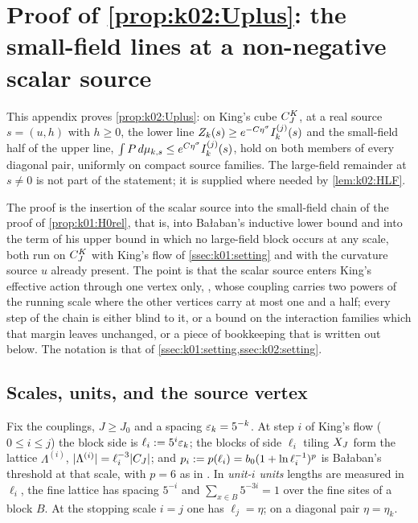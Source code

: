 \section{Proof of \cref{prop:k02:Uplus}: the small-field lines at a non-negative scalar source}\label{app:a03_Uplus}

This appendix proves \cref{prop:k02:Uplus}: on King's cube $C^{K}_{J}$, at a real source $s=(u,h)$ with $h\ge0$, the lower line $Z_{k}(s)\ge e^{-C\eta^\sigma}I^{(j)}_{k}(s)$ and the small-field half of the upper line, $\int P\,d\mu_{k,s}\le e^{C\eta^\sigma}I^{(j)}_{k}(s)$, hold on both members of every diagonal pair, uniformly on compact source families. The large-field remainder at $s\ne0$ is not part of the statement; it is supplied where needed by \cref{lem:k02:HLF}.

The proof is the insertion of the scalar source into the small-field chain of the proof of \cref{prop:k01:H0rel}, that is, into Ba{\l}aban's inductive lower bound \cite[Sect.~3]{Ba1} and into the term of his upper bound \cite[(2.43)]{Ba2} in which no large-field block occurs at any scale, both run on $C^{K}_{J}$ with King's flow of \cref{ssec:k01:setting} and with the curvature source $u$ already present. The point is that the scalar source enters King's effective action through one vertex only, \cite[(3.21)]{K1}, whose coupling carries two powers of the running scale where the other vertices carry at most one and a half; every step of the chain is either blind to it, or a bound on the interaction families which that margin leaves unchanged, or a piece of bookkeeping that is written out below. The notation is that of \cref{ssec:k01:setting,ssec:k02:setting}.

\subsection{Scales, units, and the source vertex}\label{ssec:a03:setting}

Fix the couplings, $J\ge J_0$ and a spacing $\varepsilon_k=5^{-k}$. At step $i$ of King's flow ($0\le i\le j$) the block side is $\ell_i:=5^{i}\varepsilon_k$; the blocks of side $\ell_i$ tiling $X_J$ form the lattice $\Lambda^{(i)}$, $|\Lambda^{(i)}|=\ell_i^{-3}|C_J|$; and $p_i:= p(\ell_i)=b_0(1+\ln\ell_i^{-1})^{p}$ is Ba{\l}aban's threshold at that scale, with $p=6$ as in \cite[(3.54)]{Ba1}. In \emph{unit-$i$ units} lengths are measured in $\ell_i$, the fine lattice has spacing $5^{-i}$ and $\sum_{x\in B}5^{-3i}=1$ over the fine sites of a block $B$. At the stopping scale $i=j$ one has $\ell_j=\eta$; on a diagonal pair $\eta=\eta_k$.

